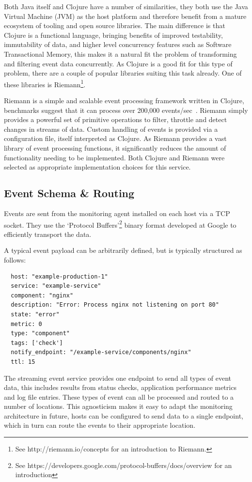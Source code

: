\documentclass{cshonours}
\begin{document}
Both Java itself and Clojure have a number of similarities, they both use the Java Virtual Machine (JVM) as the host platform and therefore benefit from a mature ecosystem of tooling and open source libraries. The main difference is that Clojure is a functional language, bringing benefits of improved testability, immutability of data, and higher level concurrency features such as Software Transactional Memory, this makes it a natural fit the problem of transforming and filtering event data concurrently. As Clojure is a good fit for this type of problem, there are a couple of popular libraries suiting this task already. One of these libraries is Riemann\footnote{See http://riemann.io/concepts for an introduction to Riemann.}.

Riemann is a simple and scalable event processing framework written in Clojure, benchmarks suggest that it can process over 200,000 events/sec~\cite{Aphyr200k}. Riemann simply provides a powerful set of primitive operations to filter, throttle and detect changes in streams of data. Custom handling of events is provided via a configuration file, itself interpreted as Clojure. As Riemann provides a vast library of event processing functions, it significantly reduces the amount of functionality needing to be implemented. Both Clojure and Riemann were selected as appropriate implementation choices for this service.

\subsection{Event Schema \& Routing}

Events are sent from the monitoring agent installed on each host via a TCP socket. They use the `Protocol Buffers'\footnote{See https://developers.google.com/protocol-buffers/docs/overview for an introduction} binary format developed at Google to efficiently transport the data.

A typical event payload can be arbitrarily defined, but is typically structured as follows:

\begin{verbatim}
  host: "example-production-1"
  service: "example-service"
  component: "nginx"
  description: "Error: Process nginx not listening on port 80"
  state: "error"
  metric: 0
  type: "component"
  tags: ['check']
  notify_endpoint: "/example-service/components/nginx"
  ttl: 15
\end{verbatim}

The streaming event service provides one endpoint to send all types of event data, this includes results from status checks, application performance metrics and log file entries. These types of event can all be processed and routed to a number of locations. This agnosticism makes it easy to adapt the monitoring architecture in future, hosts can be configured to send data to a single endpoint, which in turn can route the events to their appropriate location.
\end{document}
